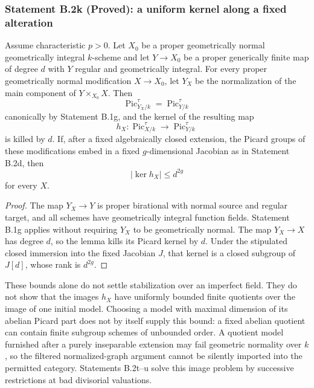 \subsubsection*{Statement B.2k (Proved): a uniform kernel along a fixed alteration}
\begin{corollary}
\label{B:B2-fixed-alteration-kernel}
Assume characteristic $p>0$.  Let $X_0$ be a proper geometrically
normal geometrically integral $k$-scheme and let $Y\to X_0$ be a
proper generically finite map of degree $d$ with $Y$ regular and
geometrically integral.  For every proper geometrically normal
modification $X\to X_0$, let $Y_X$ be the normalization of the
main component of $Y\times_{X_0}X$.  Then
\[
 \operatorname{Pic}^{\tau}_{Y_X/k}
       =\operatorname{Pic}^{\tau}_{Y/k}
\]
canonically by Statement B.1g, and the kernel of the resulting map
\[
 h_X:\operatorname{Pic}^{\tau}_{X/k}\longrightarrow
             \operatorname{Pic}^{\tau}_{Y/k}
\]
is killed by $d$.  If, after a fixed algebraically closed extension,
the Picard groups of these modifications embed in a fixed
$g$-dimensional Jacobian as in Statement B.2d, then
\[
             |\ker h_X|\leq d^{2g}
\]
for every $X$.
\end{corollary}
\begin{proof}
The map $Y_X\to Y$ is proper birational with normal source and
regular target, and all schemes have geometrically integral
function fields.  Statement B.1g applies without requiring $Y_X$
to be geometrically normal.  The map $Y_X\to X$ has degree $d$,
so the lemma kills its Picard kernel by $d$.  Under the stipulated
closed immersion into the fixed Jacobian $J$, that kernel is a
closed subgroup of $J[d]$, whose rank is $d^{2g}$.
\end{proof}

\begin{remark}
These bounds alone do not settle stabilization over an imperfect
field.  They do not show that the images $h_X$ have uniformly
bounded finite quotients over the image of one initial model.
Choosing a model with maximal dimension of its abelian Picard part
does not by itself supply this bound: a fixed abelian quotient can
contain finite subgroup schemes of unbounded order.  A quotient
model furnished after a purely inseparable extension may fail
geometric normality over $k$, so the filtered normalized-graph
argument cannot be silently imported into the permitted category.
Statements B.2t--u solve this image problem by successive
restrictions at bad divisorial valuations.
\end{remark}


